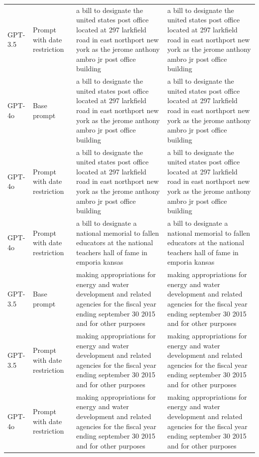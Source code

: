 \begin{longtable}{>{\raggedright\arraybackslash}p{1.4cm}>{\raggedright\arraybackslash}p{1.4cm}>{\raggedright\arraybackslash}p{5.5cm}>{\raggedright\arraybackslash}p{5.5cm}}
GPT-3.5 & Prompt with date restriction & a bill to designate the united states post office located at 297 larkfield road in east northport new york as the jerome anthony ambro jr post office building & a bill to designate the united states post office located at 297 larkfield road in east northport new york as the jerome anthony ambro jr post office building\\
GPT-4o & Base prompt & a bill to designate the united states post office located at 297 larkfield road in east northport new york as the jerome anthony ambro jr post office building & a bill to designate the united states post office located at 297 larkfield road in east northport new york as the jerome anthony ambro jr post office building\\
GPT-4o & Prompt with date restriction & a bill to designate the united states post office located at 297 larkfield road in east northport new york as the jerome anthony ambro jr post office building & a bill to designate the united states post office located at 297 larkfield road in east northport new york as the jerome anthony ambro jr post office building\\
GPT-4o & Prompt with date restriction & a bill to designate a national memorial to fallen educators at the national teachers hall of fame in emporia kansas & a bill to designate a national memorial to fallen educators at the national teachers hall of fame in emporia kansas\\
GPT-3.5 & Base prompt & making appropriations for energy and water development and related agencies for the fiscal year ending september 30 2015 and for other purposes & making appropriations for energy and water development and related agencies for the fiscal year ending september 30 2015 and for other purposes\\
GPT-3.5 & Prompt with date restriction & making appropriations for energy and water development and related agencies for the fiscal year ending september 30 2015 and for other purposes & making appropriations for energy and water development and related agencies for the fiscal year ending september 30 2015 and for other purposes\\
GPT-4o & Prompt with date restriction & making appropriations for energy and water development and related agencies for the fiscal year ending september 30 2015 and for other purposes & making appropriations for energy and water development and related agencies for the fiscal year ending september 30 2015 and for other purposes\\

\end{longtable}
